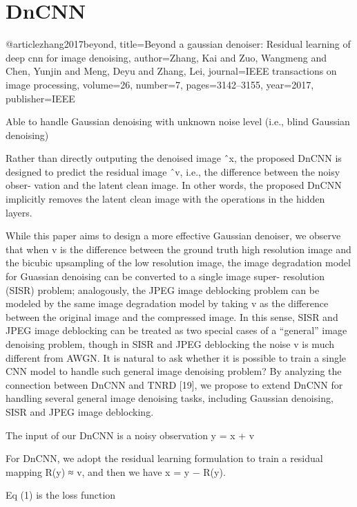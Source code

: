 \chapter{DnCNN}

@article{zhang2017beyond,
  title={Beyond a gaussian denoiser: Residual learning of deep cnn for image denoising},
  author={Zhang, Kai and Zuo, Wangmeng and Chen, Yunjin and Meng, Deyu and Zhang, Lei},
  journal={IEEE transactions on image processing},
  volume={26},
  number={7},
  pages={3142--3155},
  year={2017},
  publisher={IEEE}
}


Able to handle
Gaussian denoising with unknown noise level (i.e., blind Gaussian
denoising)

Rather than directly outputing the denoised
image ˆx, the proposed DnCNN is designed to predict the
residual image ˆv, i.e., the difference between the noisy obser-
vation and the latent clean image. In other words, the proposed
DnCNN implicitly removes the latent clean image with the
operations in the hidden layers.

While this paper aims to design a more effective Gaussian
denoiser, we observe that when v is the difference between the
ground truth high resolution image and the bicubic upsampling
of the low resolution image, the image degradation model for
Guassian denoising can be converted to a single image super-
resolution (SISR) problem; analogously, the JPEG image
deblocking problem can be modeled by the same image
degradation model by taking v as the difference between
the original image and the compressed image. In this sense,
SISR and JPEG image deblocking can be treated as two special
cases of a “general” image denoising problem, though in SISR
and JPEG deblocking the noise v is much different from
AWGN. It is natural to ask whether it is possible to train
a single CNN model to handle such general image denoising
problem? By analyzing the connection between DnCNN and
TNRD [19], we propose to extend DnCNN for handling
several general image denoising tasks, including Gaussian
denoising, SISR and JPEG image deblocking.

The input of our DnCNN is a noisy observation
y = x + v

 For DnCNN, we adopt
the residual learning formulation to train a residual mapping
R(y) ≈ v, and then we have x = y − R(y).

Eq (1) is the loss function

